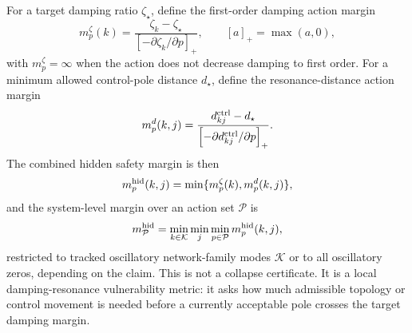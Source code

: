 \documentclass[journal]{IEEEtran}
\begin{document}
For a target damping ratio $\zeta_\star$, define the first-order damping action margin
\begin{equation}
m_p^{\zeta}(k)=
\frac{\zeta_k-\zeta_\star}
{\left[-\partial\zeta_k/\partial p\right]_+},
\qquad [a]_+=\max(a,0),
\label{eq:hiddenactionmargin}
\end{equation}
with $m_p^{\zeta}=\infty$ when the action does not decrease damping to first order. For a minimum allowed control-pole distance $d_\star$, define the resonance-distance action margin
\begin{equation}
m_p^{d}(k,j)=
\frac{d_{kj}^{\rm ctrl}-d_\star}
{\left[-\partial d_{kj}^{\rm ctrl}/\partial p\right]_+}.
\label{eq:distancemargin}
\end{equation}
The combined hidden safety margin is then
\begin{equation}
m_p^{\rm hid}(k,j)
=\min\{m_p^{\zeta}(k),m_p^{d}(k,j)\},
\label{eq:combinedhiddenmargin}
\end{equation}
and the system-level margin over an action set $\mathcal{P}$ is
\begin{equation}
m_{\mathcal{P}}^{\rm hid}
=\min_{k\in\mathcal{K}}\min_{j}\min_{p\in\mathcal{P}}
m_p^{\rm hid}(k,j),
\label{eq:hiddenmargin}
\end{equation}
restricted to tracked oscillatory network-family modes $\mathcal{K}$ or to all oscillatory zeros, depending on the claim. This is not a collapse certificate. It is a local damping-resonance vulnerability metric: it asks how much admissible topology or control movement is needed before a currently acceptable pole crosses the target damping margin.
\end{document}
